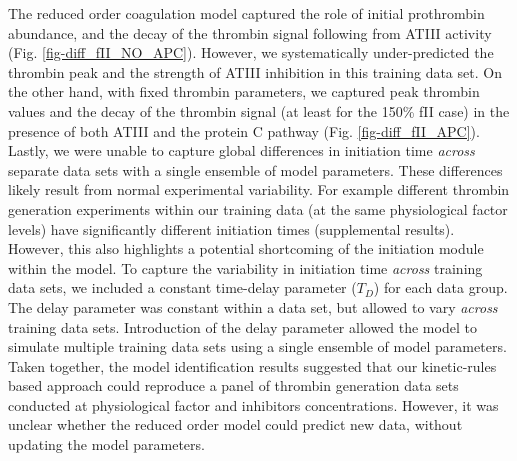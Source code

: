 \documentclass[12pt]{article}
\begin{document}
The reduced order coagulation model captured the role of initial prothrombin abundance, and the decay of the thrombin signal following from ATIII activity (Fig. \ref{fig-diff_fII_NO_APC}).
However, we systematically under-predicted the thrombin peak and the strength of ATIII inhibition in this training data set.
On the other hand, with fixed thrombin parameters, we captured peak thrombin values and the decay of the thrombin signal (at least for the 150\% fII case) in the presence
of both ATIII and the protein C pathway (Fig. \ref{fig-diff_fII_APC}). Lastly, we were unable to capture global differences in initiation time \textit{across} separate data 
sets with a single ensemble of model parameters. These differences likely result from normal experimental variability.
For example different thrombin generation experiments within our 
training data (at the same physiological factor levels) have significantly different initiation times (supplemental results). 
However, this also highlights a potential shortcoming of the initiation module within the model. 
To capture the variability in initiation time \textit{across} training data sets, we included a constant time-delay parameter ($T_{D}$) for each data group.
The delay parameter was constant within a data set, but allowed to vary \textit{across} training data sets. Introduction of the delay parameter allowed the model
to simulate multiple training data sets using a single ensemble of model parameters.
Taken together, the model identification results suggested 
that our kinetic-rules based approach could reproduce a panel of thrombin generation data sets conducted at physiological factor and inhibitors concentrations.
However, it was unclear whether the reduced order model could predict new data, without updating the model parameters.
\end{document}
